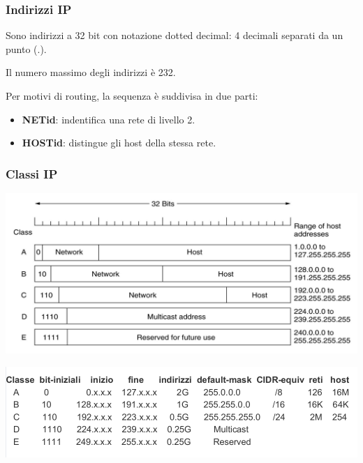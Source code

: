         \subsubsection{Indirizzi IP}
            Sono indirizzi a 32 bit con notazione dotted decimal: 4 decimali separati da un punto (.).
        
            Il numero massimo degli indirizzi è 232.
        
            Per motivi di routing, la sequenza è suddivisa in due parti:
            \begin{itemize}
                \item \textbf{NETid}: indentifica una rete di livello 2.
                \item \textbf{HOSTid}: distingue gli host della stessa rete.
            \end{itemize}

        \subsubsection{Classi IP}
            \begin{center}
                \includegraphics[scale=0.32]{chapters/4/assets/schema_e.png}
            \end{center}

            \begin{center}
                \includegraphics[scale=0.34]{chapters/4/assets/schema_f.png}
            \end{center}

